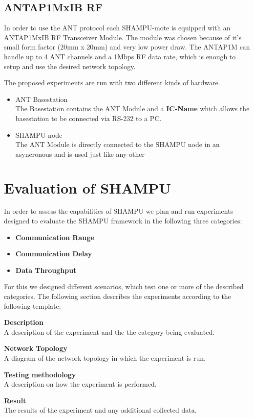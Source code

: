\section{ANTAP1MxIB RF}
In order to use the ANT protocol each SHAMPU-mote is equipped with an ANTAP1MxIB RF Transceiver Module. The module was chosen because of it's small form factor (20mm x 20mm) and very low power draw. The ANTAP1M can handle up to 4 ANT channels and a 1Mbps RF data rate, which is enough to setup and use the desired network topology.

The proposed experiments are run with two different kinds of hardware.

\begin{itemize}
	\item{ANT Basestation} \hfill \\ The Basestation contains the ANT Module and a \textbf{IC-Name} which allows the basestation to be connected via RS-232 to a PC.
	\item{SHAMPU node} \hfill \\ The ANT Module is directly connected to the SHAMPU node in an asyncronous and is used just like any other 
\end{itemize}

\chapter{Evaluation of SHAMPU}
In order to assess the capabilities of SHAMPU we plan and run experiments designed to evaluate the SHAMPU framework in the following three categories:
\begin{itemize}
	\item{\textbf{Communication Range}} 
	\item{\textbf{Communication Delay}} 
	\item{\textbf{Data Throughput}} 
\end{itemize}

For this we designed different scenarios, which test one or more of the described categories. The following section describes the experiments according to the following template:

\begin{description}
\item{\textbf{Description}} \hfill \\ A description of the experiment and the the category being evaluated.
\item{\textbf{Network Topology}} \hfill \\ A diagram of the network topology in which the experiment is run.
\item{\textbf{Testing methodology}} \hfill \\ A description on how the experiment is performed.
\item{\textbf{Result}} \hfill \\ The results of the experiment and any additional collected data.
\end{description}

